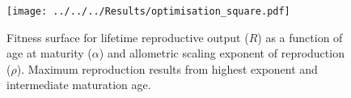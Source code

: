 \documentclass[xcolor={table}]{beamer}
\begin{document}
\begin{frame}[fragile=singleslide,t]
\begin{columns}[onlytextwidth,T]
\begin{column}{.47\textwidth}
\begin{figure}
\texttt{[image: ../../../Results/optimisation\_square.pdf]}
\caption{Fitness surface for lifetime reproductive output ($R$) as a function of age at maturity ($\alpha$) and allometric scaling exponent of reproduction ($\rho$). Maximum reproduction results from highest exponent and intermediate maturation age.}
\end{figure}

\let\mkbibnamefamily\textsc\printbibliography

\end{column}
\end{columns}


\end{frame}
\end{document}
